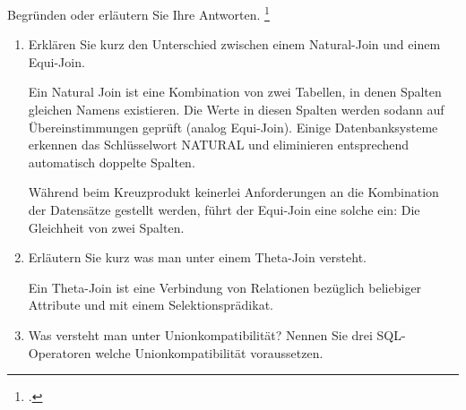 \documentclass{lehramt-informatik-aufgabe}
\begin{document}

Begründen oder erläutern Sie Ihre Antworten.
\footcite[Thema 2 Teilaufgabe 2 Aufgabe 6]{examen:66116:2019:09}

\begin{enumerate}

%

\item Erklären Sie kurz den Unterschied zwischen einem
Natural-Join und einem Equi-Join.

\begin{liAntwort}
Ein Natural Join ist eine Kombination von zwei Tabellen, in denen
Spalten gleichen Namens existieren. Die Werte in diesen Spalten werden
sodann auf Übereinstimmungen geprüft (analog Equi-Join). Einige
Datenbanksysteme erkennen das Schlüsselwort NATURAL und eliminieren
entsprechend automatisch doppelte Spalten.

Während beim Kreuzprodukt keinerlei Anforderungen an die Kombination der
Datensätze gestellt werden, führt der Equi-Join eine solche ein: Die
Gleichheit von zwei Spalten.

\end{liAntwort}

%

\item Erläutern Sie kurz was man unter einem
Theta-Join versteht.

\begin{liAntwort}
Ein Theta-Join ist eine Verbindung von Relationen bezüglich beliebiger
Attribute und mit einem Selektionsprädikat.
\end{liAntwort}

%

\item Was versteht man unter Unionkompatibilität? Nennen Sie drei
SQL-Operatoren welche Unionkompatibilität voraussetzen.


\end{enumerate}
\end{document}
